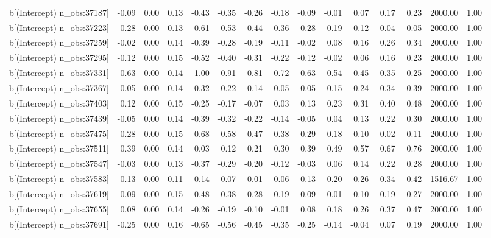 \begin{table}[ht]
\begin{tabular}{rrrrrrrrrrrrrrr}
  b[(Intercept) n\_obs:37187] & -0.09 & 0.00 & 0.13 & -0.43 & -0.35 & -0.26 & -0.18 & -0.09 & -0.01 & 0.07 & 0.17 & 0.23 & 2000.00 & 1.00 \\ 
  b[(Intercept) n\_obs:37223] & -0.28 & 0.00 & 0.13 & -0.61 & -0.53 & -0.44 & -0.36 & -0.28 & -0.19 & -0.12 & -0.04 & 0.05 & 2000.00 & 1.00 \\ 
  b[(Intercept) n\_obs:37259] & -0.02 & 0.00 & 0.14 & -0.39 & -0.28 & -0.19 & -0.11 & -0.02 & 0.08 & 0.16 & 0.26 & 0.34 & 2000.00 & 1.00 \\ 
  b[(Intercept) n\_obs:37295] & -0.12 & 0.00 & 0.15 & -0.52 & -0.40 & -0.31 & -0.22 & -0.12 & -0.02 & 0.06 & 0.16 & 0.23 & 2000.00 & 1.00 \\ 
  b[(Intercept) n\_obs:37331] & -0.63 & 0.00 & 0.14 & -1.00 & -0.91 & -0.81 & -0.72 & -0.63 & -0.54 & -0.45 & -0.35 & -0.25 & 2000.00 & 1.00 \\ 
  b[(Intercept) n\_obs:37367] & 0.05 & 0.00 & 0.14 & -0.32 & -0.22 & -0.14 & -0.05 & 0.05 & 0.15 & 0.24 & 0.34 & 0.39 & 2000.00 & 1.00 \\ 
  b[(Intercept) n\_obs:37403] & 0.12 & 0.00 & 0.15 & -0.25 & -0.17 & -0.07 & 0.03 & 0.13 & 0.23 & 0.31 & 0.40 & 0.48 & 2000.00 & 1.00 \\ 
  b[(Intercept) n\_obs:37439] & -0.05 & 0.00 & 0.14 & -0.39 & -0.32 & -0.22 & -0.14 & -0.05 & 0.04 & 0.13 & 0.22 & 0.30 & 2000.00 & 1.00 \\ 
  b[(Intercept) n\_obs:37475] & -0.28 & 0.00 & 0.15 & -0.68 & -0.58 & -0.47 & -0.38 & -0.29 & -0.18 & -0.10 & 0.02 & 0.11 & 2000.00 & 1.00 \\ 
  b[(Intercept) n\_obs:37511] & 0.39 & 0.00 & 0.14 & 0.03 & 0.12 & 0.21 & 0.30 & 0.39 & 0.49 & 0.57 & 0.67 & 0.76 & 2000.00 & 1.00 \\ 
  b[(Intercept) n\_obs:37547] & -0.03 & 0.00 & 0.13 & -0.37 & -0.29 & -0.20 & -0.12 & -0.03 & 0.06 & 0.14 & 0.22 & 0.28 & 2000.00 & 1.00 \\ 
  b[(Intercept) n\_obs:37583] & 0.13 & 0.00 & 0.11 & -0.14 & -0.07 & -0.01 & 0.06 & 0.13 & 0.20 & 0.26 & 0.34 & 0.42 & 1516.67 & 1.00 \\ 
  b[(Intercept) n\_obs:37619] & -0.09 & 0.00 & 0.15 & -0.48 & -0.38 & -0.28 & -0.19 & -0.09 & 0.01 & 0.10 & 0.19 & 0.27 & 2000.00 & 1.00 \\ 
  b[(Intercept) n\_obs:37655] & 0.08 & 0.00 & 0.14 & -0.26 & -0.19 & -0.10 & -0.01 & 0.08 & 0.18 & 0.26 & 0.37 & 0.47 & 2000.00 & 1.00 \\ 
  b[(Intercept) n\_obs:37691] & -0.25 & 0.00 & 0.16 & -0.65 & -0.56 & -0.45 & -0.35 & -0.25 & -0.14 & -0.04 & 0.07 & 0.19 & 2000.00 & 1.00 \\ 

\end{tabular}
\end{table}
